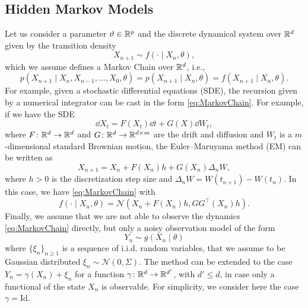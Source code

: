 \documentclass{article}
\begin{document}
\maketitle

\subsection*{Hidden Markov Models}

Let us consider a parameter $\vartheta \in \mathbb{R}^p$ and the discrete dynamical system over $\mathbb{R}^d$ given by the transition density
\begin{equation}\label{eq:MarkovChain}
	X_{n+1} \sim f(\cdot \mid X_n, \theta),
\end{equation} 
which we assume defines a Markov Chain over $\mathbb{R}^d$, i.e., 
\begin{equation}
	p(X_{n+1} \mid X_n, X_{n-1}, \ldots, X_0, \theta) = p(X_{n+1} \mid X_n, \theta) = f(X_{n+1} \mid X_n, \theta).
\end{equation}
For example, given a stochastic differential equations (SDE), the recursion given by a numerical integrator can be cast in the form \eqref{eq:MarkovChain}. For example, if we have the SDE 
\begin{equation}
	\dd X_t = F(X_t) \dd t + G(X) \dd W_t,
\end{equation}
where $F\colon \mathbb{R}^d \to \mathbb{R}^d$ and $G\colon \mathbb{R}^d \to \mathbb{R}^{d\times m}$ are the drift and diffusion and $W_t$ is a $m$-dimensional standard Brownian motion, the Euler--Maruyama method (EM) can be written as
\begin{equation}
	X_{n+1} = X_n + F(X_n) h + G(X_n) \Delta_n W,
\end{equation}
where $h > 0$ is the discretization step size and $\Delta_n W = W(t_{n+1}) - W(t_n)$. In this case, we have \eqref{eq:MarkovChain} with 
\begin{equation} 
	f(\cdot \mid X_n, \theta) = \mathcal N\left(X_n + F(X_n)h, GG^\top(X_n) h \right).
\end{equation}
Finally, we assume that we are not able to observe the dynamics \eqref{eq:MarkovChain} directly, but only a noisy observation model of the form 
\begin{equation}
	Y_n \sim g(X_n \mid \theta)
\end{equation}
where $\{\xi_n\}_{n\geq 1}$ is a sequence of i.i.d. random variables, that we assume to be Gaussian distributed $\xi_n \sim \mathcal N(0, \Sigma)$. The method can be extended to the case $Y_n = \gamma(X_n) + \xi_n$ for a function $\gamma \colon \mathbb{R}^d \to \mathbb{R}^{d'}$, with $d' \leq d$, in case only a functional of the state $X_n$ is observable. For simplicity, we consider here the case $\gamma = \mathrm{Id}$.
\end{document}
